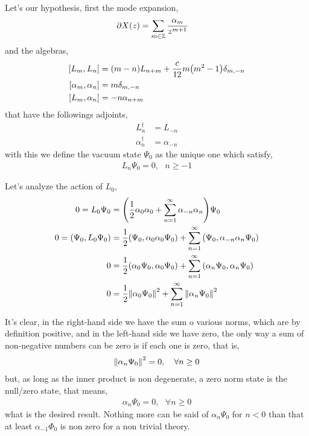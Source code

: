 \problem{}
\probitem{}

Let's our hypothesis, first the mode expansion,
\begin{align*}
    \partial X\qty(z)&=\sum\limits_{m\in\mathbb Z}\frac{\alpha_m}{z^{m+1}}
\end{align*}
and the algebras,
\begin{align*}
    \comm{L_m}{L_n}&=\qty(m-n)L_{n+m}+\frac{c}{12}m\qty(m^2-1)\delta_{m,-n}\\
    \comm{\alpha_m}{\alpha_n}&=m\delta_{m,-n}\\
    \comm{L_m}{\alpha_n}&=-n\alpha_{n+m}
\end{align*}
that have the followings adjoints,
\begin{align*}
    L^\dagger_n&=L_{-n}\\
    \alpha^{\dagger}_n&=\alpha_{-n}
\end{align*}
with this we define the vacuum state $\Psi_0$ as the unique one which satisfy,
\begin{align*}
    L_n\Psi_0=0,\ \ \ n\geq-1
\end{align*}

Let's analyze the action of $L_0$,
\begin{align*}
    0=L_0\Psi_0&=\qty(\frac12\alpha_0\alpha_0+\sum\limits_{n=1}^\infty\alpha_{-n}\alpha_n)\Psi_0\\
    0=\qty(\Psi_0,L_0\Psi_0)&=\frac12\qty(\Psi_0,\alpha_0\alpha_0\Psi_0)+\sum\limits_{n=1}^\infty\qty(\Psi_0,\alpha_{-n}\alpha_n\Psi_0)\\
    0&=\frac12\qty(\alpha_0\Psi_0,\alpha_0\Psi_0)+\sum\limits_{n=1}^\infty\qty(\alpha_{n}\Psi_0,\alpha_n\Psi_0)\\
    0&=\frac12\norm{\alpha_0\Psi_0}^2+\sum\limits_{n=1}^\infty\norm{\alpha_n\Psi_0}^2
\end{align*}

It's clear, in the right-hand side we have the sum o various norms, which are by definition positive, and in the left-hand side we have zero, 
the only way a sum of non-negative numbers can be zero is if each one is zero, that is,
\begin{align*}
    \norm{\alpha_n\Psi_0}^2=0,\ \ \ \forall n\geq 0
\end{align*}
but, as long as the inner product is non degenerate, a zero norm state is the null/zero state, that means,
\begin{align*}
    \alpha_n\Psi_0=0,\ \ \ \forall n\geq 0
\end{align*}
what is the desired result. Nothing more can be said of $\alpha_n\Psi_0$ for $n<0$ than that at least $\alpha_{-1}\Phi_0$ is non zero for a non trivial theory.


